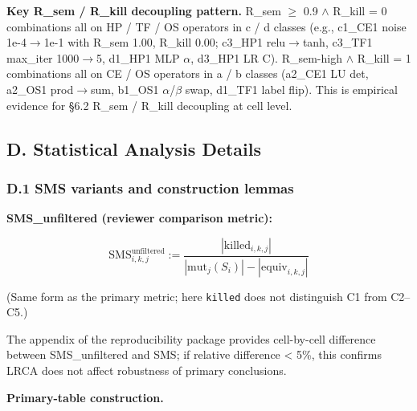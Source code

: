 \documentclass[review,12pt,authoryear]{elsarticle}
\begin{document}
\textbf{Key R\_sem / R\_kill decoupling pattern.} R\_sem $\geq$ 0.9 $\wedge$ R\_kill
= 0 combinations all on HP / TF / OS operators in c / d classes (e.g.,
c1\_CE1 noise 1e-4$\to$1e-1 with R\_sem 1.00, R\_kill 0.00; c3\_HP1
relu$\to$tanh, c3\_TF1 max\_iter 1000$\to$5, d1\_HP1 MLP $\alpha$, d3\_HP1 LR C).
R\_sem-high $\wedge$ R\_kill = 1 combinations all on CE / OS operators in a / b
classes (a2\_CE1 LU det, a2\_OS1 prod$\to$sum, b1\_OS1 $\alpha$/$\beta$ swap, d1\_TF1
label flip). This is empirical evidence for §6.2 R\_sem / R\_kill
decoupling at cell level.


\subsection{D. Statistical Analysis Details}\label{d.-statistical-analysis-details}

\subsubsection{D.1 SMS variants and construction lemmas}\label{d.1-sms-variants-and-construction-lemmas}

\textbf{SMS\_unfiltered (reviewer comparison metric):}

\[
\mathrm{SMS}^{\mathrm{unfiltered}}_{i,k,j} := \frac{|\mathrm{killed}_{i,k,j}|}{|\mathrm{mut}_j(S_i)| - |\mathrm{equiv}_{i,k,j}|}
\]

(Same form as the primary metric; here \texttt{killed} does not distinguish C1 from C2--C5.)

The appendix of the reproducibility package provides cell-by-cell
difference between SMS\_unfiltered and SMS; if relative difference
\textless{} 5\%, this confirms LRCA does not affect robustness of
primary conclusions.

\textbf{Primary-table construction.}
\end{document}
